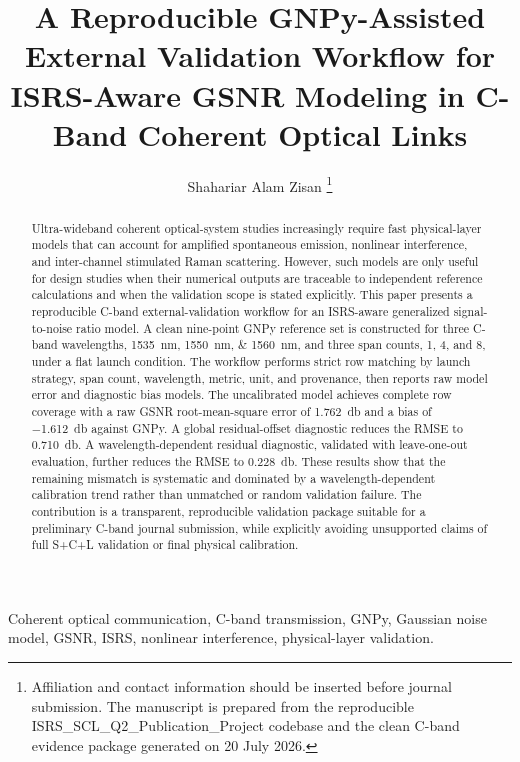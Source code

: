 \documentclass[journal]{IEEEtran}
\begin{document}
\title{A Reproducible GNPy-Assisted External Validation Workflow for ISRS-Aware GSNR Modeling in C-Band Coherent Optical Links}

\author{Shahariar Alam Zisan%
\thanks{Affiliation and contact information should be inserted before journal submission. The manuscript is prepared from the reproducible ISRS\_SCL\_Q2\_Publication\_Project codebase and the clean C-band evidence package generated on 20 July 2026.}%
}

\maketitle

\begin{abstract}
Ultra-wideband coherent optical-system studies increasingly require fast physical-layer models that can account for amplified spontaneous emission, nonlinear interference, and inter-channel stimulated Raman scattering. However, such models are only useful for design studies when their numerical outputs are traceable to independent reference calculations and when the validation scope is stated explicitly. This paper presents a reproducible C-band external-validation workflow for an ISRS-aware generalized signal-to-noise ratio model. A clean nine-point GNPy reference set is constructed for three C-band wavelengths, \SIlist{1535;1550;1560}{\nano\meter}, and three span counts, 1, 4, and 8, under a flat launch condition. The workflow performs strict row matching by launch strategy, span count, wavelength, metric, unit, and provenance, then reports raw model error and diagnostic bias models. The uncalibrated model achieves complete row coverage with a raw GSNR root-mean-square error of \SI{1.762}{\decibel} and a bias of \SI{-1.612}{\decibel} against GNPy. A global residual-offset diagnostic reduces the RMSE to \SI{0.710}{\decibel}. A wavelength-dependent residual diagnostic, validated with leave-one-out evaluation, further reduces the RMSE to \SI{0.228}{\decibel}. These results show that the remaining mismatch is systematic and dominated by a wavelength-dependent calibration trend rather than unmatched or random validation failure. The contribution is a transparent, reproducible validation package suitable for a preliminary C-band journal submission, while explicitly avoiding unsupported claims of full S+C+L validation or final physical calibration.
\end{abstract}

\begin{IEEEkeywords}
Coherent optical communication, C-band transmission, GNPy, Gaussian noise model, GSNR, ISRS, nonlinear interference, physical-layer validation.
\end{IEEEkeywords}
\end{document}
